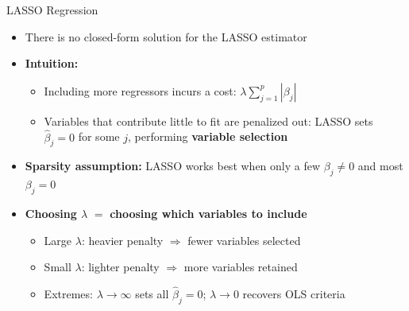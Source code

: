 \documentclass[dvipsnames,hyperref={pdfpagelabels=false}]{beamer}
\begin{document}
\begin{frame}{LASSO Regression}
    \begin{itemize}
        \item There is no closed-form solution for the LASSO estimator
        \vspace{0.2cm}
        \item \textbf{Intuition:}
        \begin{itemize}
            \vspace{0.2cm}
            \item Including more regressors incurs a cost: 
            $\lambda \sum^{p}_{j=1} |\beta_{j}|$
            \vspace{0.2cm}
            \item Variables that contribute little to fit are 
            penalized out: LASSO sets $\hat{\beta}_{j} = 0$ 
            for some $j$, performing \textbf{variable selection}
        \end{itemize}
        \vspace{0.2cm}
        \item \textbf{Sparsity assumption:} LASSO works best when 
        only a few $\beta_j \neq 0$ and most $\beta_j = 0$
        \vspace{0.2cm}
        \item \textbf{Choosing $\lambda$} $=$ \textbf{choosing which variables to include}
        \begin{itemize}
            \vspace{0.2cm}
            \item Large $\lambda$: heavier penalty $\Rightarrow$ fewer variables selected
            \vspace{0.2cm}
            \item Small $\lambda$: lighter penalty $\Rightarrow$ more variables retained
            \vspace{0.2cm}
            \item Extremes: $\lambda \to \infty$ sets all $\hat{\beta}_j = 0$; 
            $\lambda \to 0$ recovers OLS
            criteria 
        \end{itemize}
    \end{itemize}
\end{frame}
\end{document}
